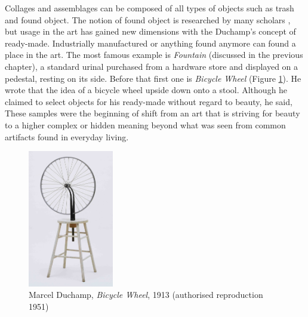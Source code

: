 Collages and assemblages can be composed of all types of objects such as trash and found object. The notion of found object is researched by many scholars \cite{camic2010trashed, gascoyne1935short}, but usage in the art has gained new dimensions with the Duchamp's concept of ready-made. Industrially manufactured or anything found  anymore can found a place in the art. The most famous example is \textit{Fountain} (discussed in the previous chapter), a standard urinal purchased from a hardware store and displayed on a pedestal, resting on its side. Before that first one is \textit{Bicycle Wheel} (Figure \ref{fig:Duchamp_BicycleWheel}). He wrote that the idea of a bicycle wheel upside down onto a stool. Although he claimed to select objects for his ready-made without regard to beauty, he said,  These samples were the beginning of 
shift from an art that is striving for beauty to a higher complex or hidden meaning beyond what was seen from common artifacts found in everyday living.

\begin{figure}[h!]
  \centering
  \includegraphics[height=6cm]{graphics/duchamp-bicycle-wheel-1913.jpg}
  \caption{Marcel Duchamp, \textit{Bicycle Wheel}, 1913 (authorised reproduction 1951)}
  \label{fig:Duchamp_BicycleWheel}
\end{figure}

